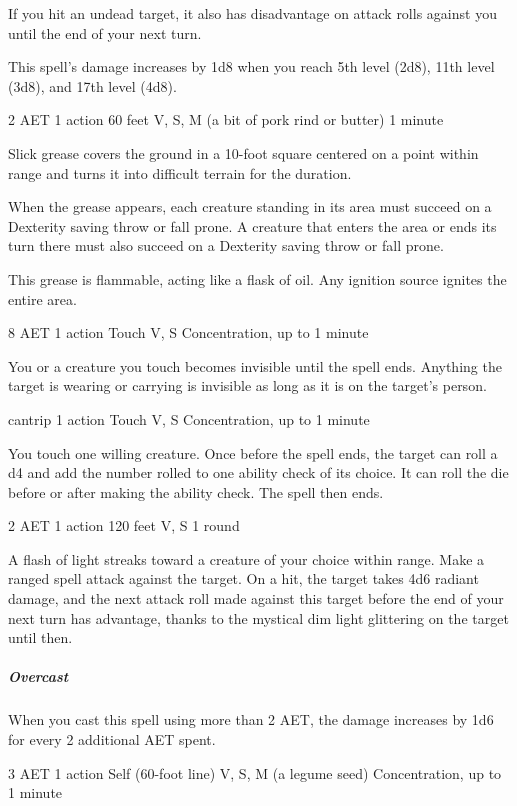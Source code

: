 If you hit an undead target, it also has disadvantage on attack rolls against you until the end of your next turn.

This spell's damage increases by 1d8 when you reach 5th level (2d8), 11th level (3d8), and 17th level (4d8).


{2 AET}
{1 action}
{60 feet}
{V, S, M (a bit of pork rind or butter)}
{1 minute}

Slick grease covers the ground in a 10-foot square centered on a point within range and turns it into difficult terrain for the duration.

When the grease appears, each creature standing in its area must succeed on a Dexterity saving throw or fall prone. A creature that enters the area or ends its turn there must also succeed on a Dexterity saving throw or fall prone.

This grease is flammable, acting like a flask of oil. Any ignition source ignites the entire area.


{8 AET}
{1 action}
{Touch}
{V, S}
{Concentration, up to 1 minute}

You or a creature you touch becomes invisible until the spell ends. Anything the target is wearing or carrying is invisible as long as it is on the target's person.


{cantrip}
{1 action}
{Touch}
{V, S}
{Concentration, up to 1 minute}

You touch one willing creature. Once before the spell ends, the target can roll a d4 and add the number rolled to one ability check of its choice. It can roll the die before or after making the ability check. The spell then ends.


{2 AET}
{1 action}
{120 feet}
{V, S}
{1 round}

A flash of light streaks toward a creature of your choice within range. Make a ranged spell attack against the target. On a hit, the target takes 4d6 radiant damage, and the next attack roll made against this target before the end of your next turn has advantage, thanks to the mystical dim light glittering on the target until then.

\subparagraph*{Overcast} When you cast this spell using more than 2 AET, the damage increases by 1d6 for every 2 additional AET spent.

{3 AET}
{1 action}
{Self (60-foot line)}
{V, S, M (a legume seed)}
{Concentration, up to 1 minute}

